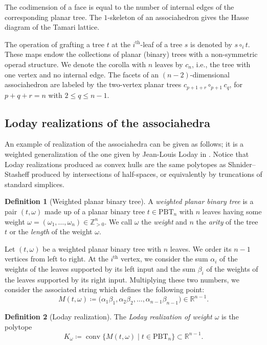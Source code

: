 \documentclass[11pt]{article}
\newcommand{\ie}{i.e.,\xspace}
\numberwithin{equation}{section}\providecommand{\No}{}
\theoremstyle{plain}
\theoremstyle{definition}
\newtheorem{definition}{Definition}
\newcommand{\RR}{\mathbb{R}}
\newcommand{\ZP}{\mathbb{Z}_{>0}}
\newcommand{\K}{{K}}
\newcommand{\Tam}[1]{\mathrm{PBT}_{#1}}
\DeclareMathOperator{\conv}{conv}
\begin{document}
The codimension of a face is equal to the number of internal edges of the corresponding planar tree.
The $1$-skeleton of an associahedron gives the Hasse diagram of the Tamari lattice.

The operation of grafting a tree $t$ at the $i^\text{th}$-leaf of a tree $s$ is denoted by $s\circ_i t$.
These maps endow the collections of planar (binary) trees with a non-symmetric operad structure.
We denote the corolla with $n$ leaves by $c_n$, \ie the tree with one vertex and no internal edge. The facets of an $(n-2)$-dimensional associahedron are labeled by
the two-vertex planar trees $c_{p+1+r} \circ_{p+1} c_q$, for $p+q+r=n$ with $2\leq q\leq n-1$.

\subsection{Loday realizations of the associahedra}

An example of realization of the associahedra can be given as follows; it is a weighted generalization of the one given by Jean-Louis Loday in \cite{Loday04a}. Notice that Loday realizations produced as convex hulls are the same polytopes as Shnider--Stasheff \cite{StasheffShnider97} produced by intersections of half-spaces, or equivalently by truncations of standard simplices.

\begin{definition}[Weighted planar binary tree]
A \emph{weighted planar binary tree} is a pair $(t, \omega)$ made up of a planar binary tree $t\in \Tam{n}$ with $n$ leaves having some weight $\omega= (\omega_1, \ldots, \omega_n) \in \ZP^n$. We call
$\omega$ the \emph{weight} and
$n$ the \emph{arity} of the tree $t$ or the \emph{length} of the weight $\omega$.
\end{definition}

Let $(t, \omega)$ be a weighted planar binary tree with $n$ leaves. We order its $n-1$ vertices from left to right. At the $i^\text{th}$ vertex, we consider the sum $\alpha_i$ of the weights of the leaves supported by its left input and
the sum $\beta_i$ of the weights of the leaves supported by its right input.
Multiplying these two numbers, we consider the associated string which defines the following point:\vspace*{-3pt}
\[M(t, \omega) \coloneqq \big(\alpha_1\beta_1, \alpha_2\beta_2, \ldots, \alpha_{n-1}\beta_{n-1}\big)\in \RR^{n-1}. \]

\begin{definition}[Loday realization]
The \emph{Loday realization of weight $\omega$} is the polytope\vspace*{-3pt}
\[\K_\omega \coloneqq \conv \big\{M(t, \omega)\mid t\in \Tam{n} \big\}\subset \RR^{n-1}.\]
\end{definition}
\end{document}
